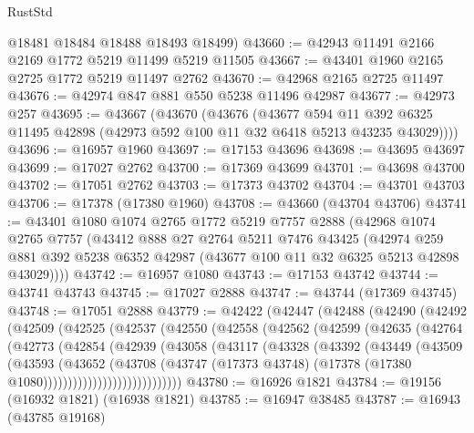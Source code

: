 \begin{lexlean}{RustStd}
\begin{coremodule}
      @18481
      @18484
      @18488
      @18493
      @18499)
@43660 := @42943 @11491 @2166 @2169 @1772 @5219 @11499 @5219 @11505
@43667 := @43401 @1960 @2165 @2725 @1772 @5219 @11497 @2762
@43670 := @42968 @2165 @2725 @11497
@43676 := @42974 @847 @881 @550 @5238 @11496 @42987
@43677 := @42973 @257
@43695 := @43667
    (@43670
      (@43676
        (@43677
          @594
          @11
          @392
          @6325
          @11495
          @42898
          (@42973 @592 @100 @11 @32 @6418 @5213 @43235 @43029))))
@43696 := @16957 @1960
@43697 := @17153 @43696
@43698 := @43695 @43697
@43699 := @17027 @2762
@43700 := @17369 @43699
@43701 := @43698 @43700
@43702 := @17051 @2762
@43703 := @17373 @43702
@43704 := @43701 @43703
@43706 := @17378 (@17380 @1960)
@43708 := @43660 (@43704 @43706)
@43741 := @43401
    @1080
    @1074
    @2765
    @1772
    @5219
    @7757
    @2888
    (@42968
      @1074
      @2765
      @7757
      (@43412
        @888
        @27
        @2764
        @5211
        @7476
        @43425
        (@42974 @259 @881 @392 @5238 @6352 @42987 (@43677 @100 @11 @32 @6325 @5213 @42898 @43029))))
@43742 := @16957 @1080
@43743 := @17153 @43742
@43744 := @43741 @43743
@43745 := @17027 @2888
@43747 := @43744 (@17369 @43745)
@43748 := @17051 @2888
@43779 := @42422
    (@42447
      (@42488
        (@42490
          (@42492
            (@42509
              (@42525
                (@42537
                  (@42550
                    (@42558
                      (@42562
                        (@42599
                          (@42635
                            (@42764
                              (@42773
                                (@42854
                                  (@42939
                                    (@43058
                                      (@43117
                                        (@43328
                                          (@43392
                                            (@43449
                                              (@43509
                                                (@43593
                                                  (@43652
                                                    (@43708
                                                      (@43747
                                                        (@17373 @43748)
                                                        (@17378
                                                          (@17380 @1080))))))))))))))))))))))))))))
@43780 := @16926 @1821
@43784 := @19156 (@16932 @1821) (@16938 @1821)
@43785 := @16947 @38485
@43787 := @16943 (@43785 @19168)

\end{coremodule}
\end{lexlean}
